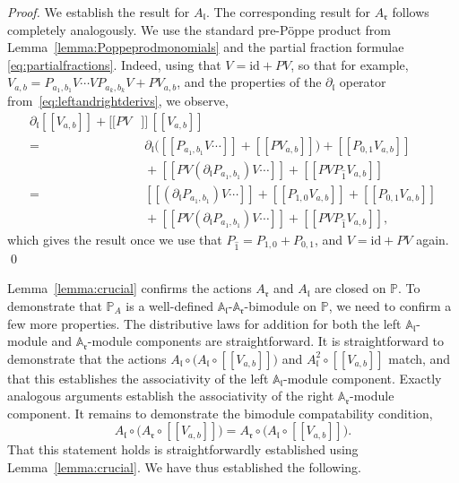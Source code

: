 \documentclass[5p,twocolumn]{elsarticle}
\newcommand*{\id}{{\mathrm{id}}}
\newcommand*{\pa}{{\partial}}
\newcommand*{\lb}{[\![}
\newcommand*{\rb}{]\!]}
\newcommand*{\el}{\mathfrak l}
\newcommand*{\rl}{\mathfrak r}
\begin{document}
%
\begin{proof}
    We establish the result for $A_{\el}$. The corresponding result for $A_{\rl}$ follows completely analogously.
    We use the standard pre-P\"oppe product from Lemma~\ref{lemma:Poppeprodmonomials} and the partial fraction formulae \eqref{eq:partialfractions}.
    Indeed, using that $V=\id+PV$, so that for example, $V_{a,b}=P_{a_1,b_1}V\cdots VP_{a_k,b_k}V+PV_{a,b}$,
    and the properties of the $\pa_{\el}$ operator from~\eqref{eq:leftandrightderivs}, we observe, 
    \begin{align*}
      \pa_{\el}\lb V_{a,b}\rb+\lb PV&\rb\,\lb V_{a,b}\rb\\
                        =&\;\pa_{\el}\bigl(\lb P_{a_1,b_1}V\cdots\rb+\lb PV_{a,b}\rb\bigr)+\lb P_{0,1}V_{a,b}\rb\\
                         &\;+\lb PV(\pa_{\el}P_{a_1,b_1})V\cdots\rb+\lb PVP_{\hat{1}}V_{a,b}\rb\\
                        =&\;\lb (\pa_{\el}P_{a_1,b_1})V\cdots\rb+\lb P_{1,0}V_{a,b}\rb+\lb P_{0,1}V_{a,b}\rb\\
                         &\;+\lb PV(\pa_{\el}P_{a_1,b_1})V\cdots\rb+\lb PVP_{\hat{1}}V_{a,b}\rb,
    \end{align*}
    which gives the result once we use that $P_{\hat{1}}=P_{1,0}+P_{0,1}$, and $V=\id+PV$ again.
\qed
\end{proof}
%
Lemma~\ref{lemma:crucial} confirms the actions $A_{\rl}$ and $A_{\el}$ are closed on $\mathbb P$.
To demonstrate that $\mathbb{P}_A$ is a well-defined $\mathbb{A}_{\el}$-$\mathbb{A}_{\rl}$-bimodule on $\mathbb{P}$, we need to confirm a few more properties.
The distributive laws for addition for both the left $\mathbb{A}_{\el}$-module and $\mathbb{A}_{\rl}$-module components are straightforward. 
It is straightforward to demonstrate that the actions $A_{\el}\circ\bigl(A_{\el}\circ\lb V_{a,b}\rb\bigr)$ and $A_{\el}^2\circ\lb V_{a,b}\rb$ match,
and that this establishes the associativity of the left $\mathbb{A}_{\el}$-module component.
Exactly analogous arguments establish the associativity of the right $\mathbb{A}_{\rl}$-module component.
It remains to demonstrate the bimodule compatability condition,
\begin{equation}\label{eq:bimodulecompatability}
  A_{\el}\circ\bigl(A_{\rl}\circ\lb V_{a,b}\rb\bigr)=A_{\rl}\circ\bigl(A_{\el}\circ\lb V_{a,b}\rb\bigr).
\end{equation}
That this statement holds is straightforwardly established using Lemma~\ref{lemma:crucial}.
We have thus established the following.
\end{document}
